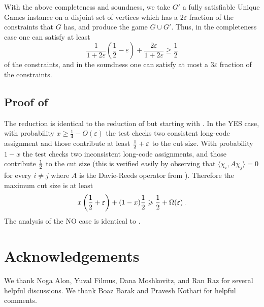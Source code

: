 \documentclass{toc}
\newcommand\half{{1\over2}}
\newcommand\inner[2]{\langle{#1},{#2}\rangle}
\newcommand\eps{\varepsilon}
\renewcommand\geq{\geqslant}
\begin{document}
With the above completeness and soundness, we take $G'$ a fully satisfiable Unique Games instance on a disjoint set of vertices which
has
a %
$2\eps$ fraction of the constraints that $G$ has, and produce the game $G\cup G'$. Thus, in the completeness case one can
satisfy at least
\[
\frac{1}{1+2\eps}\left(\frac{1}{2}-\eps\right) + \frac{2\eps}{1+2\eps}
\geq \frac{1}{2}
\]
of the constraints, and in the soundness one can satisfy at most
a %
$3\eps$ fraction of the constraints.
\subsection{Proof of }\label{sec:pf_of_MCG}
The reduction is identical to the reduction of \cite{KhotOdonell} but starting with
.  %
In the YES case, with probability $x\geq \frac{1}{4}-O(\eps)$ the test checks two consistent long-code assignment and those contribute at least $\half+\eps$ to the cut size. With probability $1-x$ the test checks two inconsistent long-code assignments,
and those contribute $\half$ to the cut size (this is verified easily by observing that $\inner{\chi_i}{A\chi_j}=0$
for every $i\neq j$ where $A$ is the Davie-Reeds operator from \cite{KhotOdonell}). Therefore the maximum cut size is at least
\[
x\left(\half+\eps\right)+(1-x)\half\geq \half +\Omega(\eps)\,.
\]
The analysis of the NO case is identical to \cite{KhotOdonell}.


\section*{Acknowledgements}
We thank Noga Alon, Yuval Filmus, Dana Moshkovitz, and Ran Raz for several helpful
discussions. We thank Boaz Barak and Pravesh Kothari for helpful comments.



%
%
%
%

\end{document}
